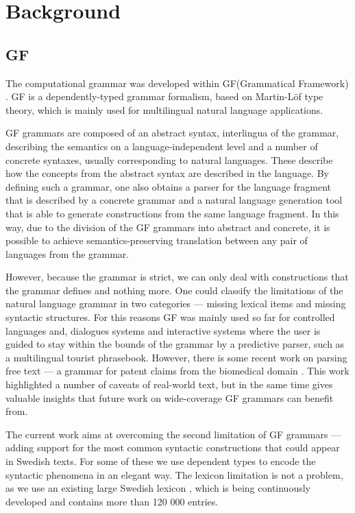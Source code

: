 \documentclass[runningheads,a4paper]{llncs}
\begin{document}


\section{Background}

\subsection{GF}
\label{sec:gf}

The computational grammar was developed within GF(Grammatical
Framework) \cite{gfbok}. GF is a dependently-typed grammar formalism,
based on Martin-Löf type theory, which is mainly used for
multilingual natural language applications. 

GF grammars are composed of an abstract syntax, interlingua of the
grammar, describing the semantics on a language-independent level and
a number of concrete syntaxes, usually corresponding to natural
languages. These describe how the concepts from the abstract syntax
are described in the language. 
By defining such a grammar, one also obtains a parser for the language
fragment that is described by a concrete grammar and a natural
language generation tool that is able to generate constructions from
the same language fragment. 
In this way, due to the division of the GF
grammars into abstract and concrete, it is possible to achieve 
semantics-preserving translation between any pair of languages from 
the grammar. 
 
However, because the grammar is strict, we can only deal with
constructions that the grammar defines and nothing more. One could
classify the limitations of the natural language grammar in two
categories --- missing lexical items and missing syntactic
structures. For this reasons GF was mainly used so far for controlled
languages\cite{cnl} and, dialogues systems \cite{talk} and interactive 
systems where the user is guided to stay
within the bounds of the grammar by a predictive
parser\cite{parser}, such as a multilingual tourist
phrasebook\cite{phrasebook}. 
However, there is some recent work on parsing
free text --- a grammar for patent claims from the biomedical
domain \cite{patent}. This work highlighted a
number of caveats of real-world text, but in the same time gives
valuable insights that future work on wide-coverage GF grammars can
benefit from.

The current work aims at overcoming the second limitation of GF
grammars --- adding support for the most common syntactic
constructions that could appear in Swedish texts. For some of these we
use dependent types to encode the syntactic phenomena in an elegant
way. The lexicon limitation is not a problem, as we use an existing 
large Swedish lexicon \cite{ahlbergEnache}, which is being continuously
developed and contains more than 120 000 entries.
\end{document}
